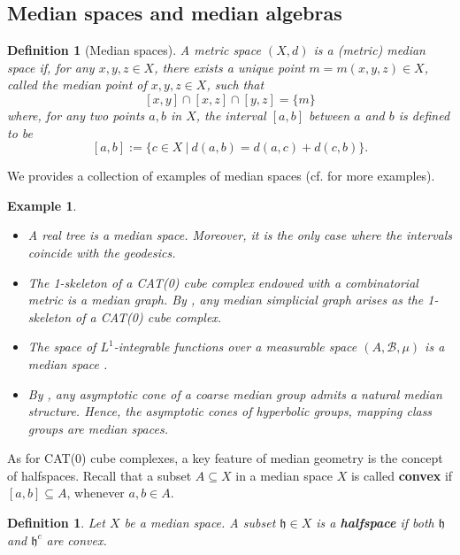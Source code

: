 \documentclass{amsart}
\numberwithin{equation}{section}
\newtheorem{defi}[thm]{Definition}
\newtheorem{exm}[thm]{Example}
\newcommand{\BB}{\mathcal{B}}     %
\newcommand{\hh}{\mathfrak{h}}    %
\theoremstyle{definition}
\begin{document}
\subsection{Median spaces and median algebras}
\begin{defi}[Median spaces]
    A metric space $(X,d)$ is a (metric) median space if, for any $x,y,z\in X$, there exists a unique point $m = m(x,y,z) \in X$, called the median point of $x,y,z\in X$, such that 
    \[
    [x,y]\cap[x,z]\cap [y,z]=\{m\}
    \]
    where, for any two points $a,b$ in $X$, the interval $[a,b]$ between $a$ and $b$ is defined to be
    \[
    [a,b]:=\{c\in X\ | \ d(a,b)=d(a,c)+d(c,b)\}.
    \]
\end{defi}
\par
We provides a collection of examples of median spaces (cf. \cite{ChaDH_median} for more examples).
\begin{exm}
    \begin{itemize}
        \item A real tree is a median space. Moreover, it is the only case where the intervals coincide with the geodesics.
        \item The 1-skeleton of a CAT(0) cube complex endowed with a combinatorial metric is a median graph. By \cite{Chepoi}, any median simplicial graph arises as the 1- skeleton of a CAT(0) cube complex.
        \item The space of $L^1$-integrable functions over a measurable space $(A,\BB,\mu)$ is a median space \cite{ChaDH_median}.
        \item By \cite{Bowd_conv}, any asymptotic cone of a coarse median group admits a natural median structure. Hence, the asymptotic cones of hyperbolic groups, mapping class groups are median spaces.
    \end{itemize}
\end{exm}


As for CAT(0) cube complexes, a key feature of median geometry is the concept of halfspaces. Recall that a subset $A \subseteq X$ in a median space $X$ is called \textbf{convex} if $[a,b] \subseteq A$, whenever $a, b \in A$. 
\begin{defi}
    Let $X$ be a median space. A subset $\hh\in X$ is a \textbf{\textit{halfspace}} if both $\hh$ and $\hh^c$ are convex. 
\end{defi}
\end{document}
